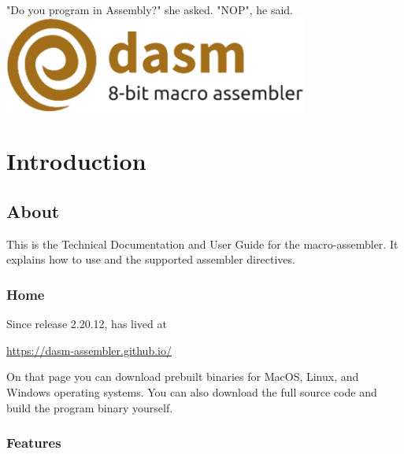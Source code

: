 \begin{savequote}
\sffamily
"Do you program in Assembly?" she asked.\newline
"NOP", he said.\\[0.5cm]



\includegraphics[width=0.75\textwidth]{dasm-logo.png}


\end{savequote}



\chapter{Introduction}



\section{About} 

This is the Technical Documentation and User Guide for the \dasm macro-assembler. It explains how
to use \dasm and the supported assembler directives.

\subsection{Home}

Since release 2.20.12, \dasm has lived at

\url{https://dasm-assembler.github.io/}

On that page you can download prebuilt binaries for MacOS, Linux, and Windows operating systems. You can also download the full source code and build the program binary yourself.


\subsection{Features}

